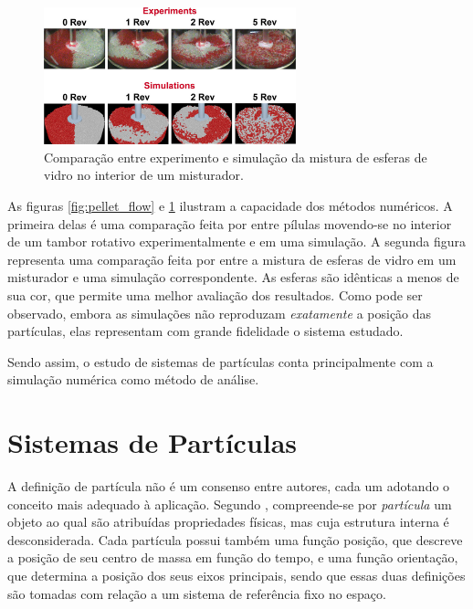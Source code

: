 \begin{figure}[h]
	\caption{Comparação entre experimento e simulação da mistura de esferas de vidro no interior de um misturador.}
	\vspace{-0.5cm}
	\begin{center}
		\includegraphics[width=0.65\textwidth]{images/drug_production.png}
	\end{center}
	\vspace{-0.2cm}
	\label{fig:drug_production}
	\vspace{-1cm}
\end{figure}

As figuras \ref{fig:pellet_flow} e \ref{fig:drug_production} ilustram a capacidade dos métodos numéricos. A primeira delas é uma comparação feita por  entre pílulas movendo-se no interior de um tambor rotativo experimentalmente e em uma simulação. A segunda figura representa uma comparação feita por  entre a mistura de esferas de vidro em um misturador e uma simulação correspondente. As esferas são idênticas a menos de sua cor, que permite uma melhor avaliação dos resultados. Como pode ser observado, embora as simulações não reproduzam \textit{exatamente} a posição das partículas, elas representam com grande fidelidade o sistema estudado.

Sendo assim, o estudo de sistemas de partículas conta principalmente com a simulação numérica como método de análise.
 
\section{Sistemas de Partículas}

A definição de partícula não é um consenso entre autores, cada um adotando o conceito mais adequado à aplicação. Segundo , compreende-se por \textit{partícula} um objeto ao qual são atribuídas propriedades físicas, mas cuja estrutura interna é desconsiderada. Cada partícula possui também uma função posição, que descreve a posição de seu centro de massa em função do tempo, e uma função orientação, que determina a posição dos seus eixos principais, sendo que essas duas definições são tomadas com relação a um sistema de referência fixo no espaço.

